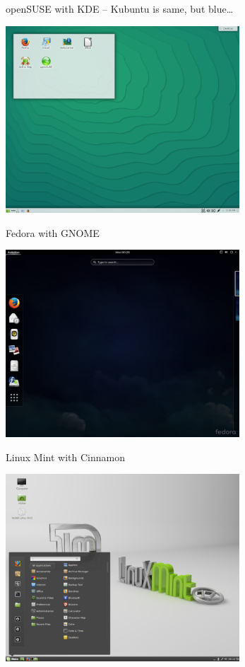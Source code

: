 \documentclass[compress, ucs, xelatex, 11pt, xcolor=svgnames,
  hyperref={
    bookmarks=true,
    unicode=true,
    colorlinks=true,
    pdftitle={Linux, command line and MetaCentrum},
    plainpages=false,
    pdfauthor={Vojtech Zeisek},
    pdfsubject={Course about use of Linux command line, writing shell scripts and using MetaCentrum of CESNET},
    pdfcreator={XeLaTeX},
    pdfkeywords={Linux, GNU, BASH, shell, command line, MetaCentrum},
    linkcolor=DarkRed,
    anchorcolor=DarkBlue,
    citecolor=Indigo,
    filecolor=NavyBlue,
    menucolor=DarkMagenta,
    urlcolor=DarkBlue,
    pdftex},
  url={hyphens, lowtilde} %
  ]{beamer}
\begin{document}
\begin{frame}{openSUSE with KDE -- Kubuntu is same, but blue\ldots}
  \begin{center}
    \includegraphics[height=7cm]{opensuse.png}
  \end{center}
\end{frame}

\begin{frame}{Fedora with GNOME}
  \begin{center}
    \includegraphics[height=7cm]{fedora.png}
  \end{center}
\end{frame}

\begin{frame}{Linux Mint with Cinnamon}
  \begin{center}
    \includegraphics[height=7cm]{mint.png}
  \end{center}
\end{frame}
\end{document}
